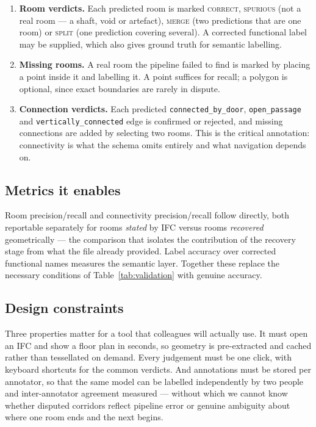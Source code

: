 \documentclass[10pt,twocolumn,letterpaper]{article}
\begin{document}
\begin{enumerate}\itemsep2pt
\item \textbf{Room verdicts.} Each predicted room is marked \textsc{correct},
\textsc{spurious} (not a real room --- a shaft, void or artefact),
\textsc{merge} (two predictions that are one room) or \textsc{split} (one
prediction covering several). A corrected functional label may be supplied,
which also gives ground truth for semantic labelling.
\item \textbf{Missing rooms.} A real room the pipeline failed to find is marked
by placing a point inside it and labelling it. A point suffices for recall; a
polygon is optional, since exact boundaries are rarely in dispute.
\item \textbf{Connection verdicts.} Each predicted \texttt{connected\_by\_door},
\texttt{open\_passage} and \texttt{vertically\_connected} edge is confirmed or
rejected, and missing connections are added by selecting two rooms. This is the
critical annotation: connectivity is what the schema omits entirely and what
navigation depends on.
\end{enumerate}

\subsection{Metrics it enables}

Room precision/recall and connectivity precision/recall follow directly, both
reportable separately for rooms \emph{stated} by IFC versus rooms
\emph{recovered} geometrically --- the comparison that isolates the contribution
of the recovery stage from what the file already provided. Label accuracy over
corrected functional names measures the semantic layer. Together these replace
the necessary conditions of Table~\ref{tab:validation} with genuine accuracy.

\subsection{Design constraints}

Three properties matter for a tool that colleagues will actually use. It must
open an IFC and show a floor plan in seconds, so geometry is pre-extracted and
cached rather than tessellated on demand. Every judgement must be one click,
with keyboard shortcuts for the common verdicts. And annotations must be stored
per annotator, so that the same model can be labelled independently by two
people and inter-annotator agreement measured --- without which we cannot know
whether disputed corridors reflect pipeline error or genuine ambiguity about
where one room ends and the next begins.
\end{document}

